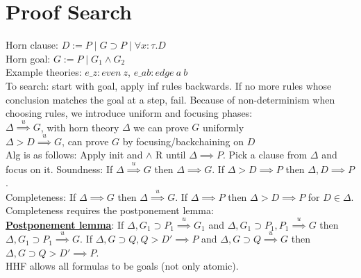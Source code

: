 \section{Proof Search}
Horn clause: $D := P \mid G \supset P \mid \forall x : \tau . D$
\\ Horn goal: $G := P \mid G_1 \land G_2$
\\ Example theories: $e\_z: even\ z$, $e\_{ab}:edge\ a\ b$
\\ To search: start with goal, apply inf rules backwards. If no more
rules whose conclusion matches the goal at a step, fail. Because of
non-determinism when choosing rules, we introduce uniform and focusing
phases:
\\ $\Delta \stackrel{u}{\implies} G$, with horn theory $\Delta$ we can
prove $G$ uniformly
\\ $\Delta > D \stackrel{u}{\implies} G$, can prove $G$ by
focusing/backchaining on $D$
\\ Alg is as follows: Apply init and $\land$ R until $\Delta \implies
P$. Pick a clause from $\Delta$ and focus on it.
Soundness: If $\Delta \stackrel{u}{\implies} G$ then $\Delta \implies
G$. If $\Delta > D \implies P$ then $\Delta, D \implies P$.
\\ Completeness: If $\Delta \implies G$ then $\Delta
\stackrel{u}{\implies} G$. If $\Delta \implies P$ then $\Delta > D
\implies P$ for $D \in \Delta$. Completeness
requires the postponement lemma:
\\ \underline{\textbf{Postponement lemma}}:
If $\Delta, G_1 \supset P_1 \stackrel{u}{\implies}G_1$ and
$\Delta, G_1 \supset P_1, P_1 \stackrel{u}{\implies} G$ then
$\Delta, G_1 \supset P_1 \stackrel{u}{\implies} G$. If $\Delta, G
\supset Q, Q > D' \implies P$ and $\Delta, G \supset Q
\stackrel{u}{\implies} G$ then $\Delta, G \supset Q > D' \implies P$.
\\ HHF allows all formulas to be goals (not only atomic).
